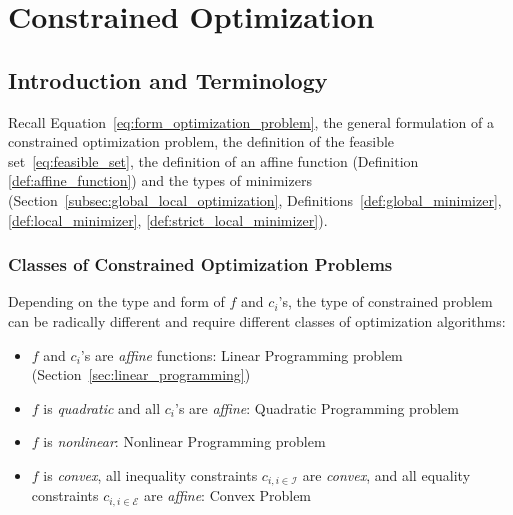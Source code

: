 \clearpage
\section{Constrained Optimization}\label{sec:constrained_optimization}
\subsection{Introduction and Terminology}\label{sec:intro_constrained_optimization}
Recall Equation~\eqref{eq:form_optimization_problem}, the general formulation of a constrained optimization problem, the definition of the feasible set~\eqref{eq:feasible_set}, the definition of an affine function (Definition \ref{def:affine_function}) and the types of minimizers (Section~\ref{subsec:global_local_optimization}, Definitions~\ref{def:global_minimizer}, \ref{def:local_minimizer}, \ref{def:strict_local_minimizer}).

\subsubsection{Classes of Constrained Optimization Problems}
Depending on the type and form of $f$ and $c_i$'s, the type of constrained problem can be radically different and require different classes of optimization algorithms:
\begin{itemize}
  \item $f$ and $c_i$'s are \emph{affine} functions: Linear Programming problem (Section~\ref{sec:linear_programming})
  \item $f$ is \emph{quadratic} and all $c_i$'s are \emph{affine}: Quadratic Programming problem
  \item $f$ is \emph{nonlinear}: Nonlinear Programming problem
  \item $f$ is \emph{convex}, all inequality constraints $c_{i,i\in\mathcal{I}}$ are \emph{convex}, and all equality constraints $c_{i,i\in\mathcal{E}}$ are \emph{affine}: Convex Problem
\end{itemize}

